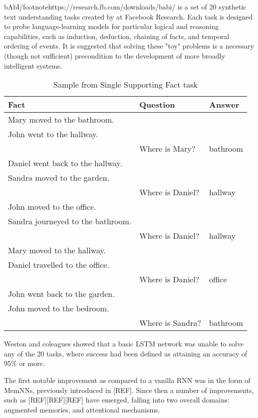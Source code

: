 \documentclass{article}
\begin{document}
bAbI/footnote{https://research.fb.com/downloads/babi/} is a set of 20 synthetic text understanding tasks created by \citet{2015arXiv150205698W} at Facebook Research. Each task is designed to probe language-learning models for particular logical and reasoning capabilities, such as induction, deduction, chaining of facts, and temporal ordering of events. It is suggested that solving these "toy" problems is a necessary (though not sufficient) precondition to the development of more broadly intelligent systems. 

\begin{table}[h]
\caption{Sample from Single Supporting Fact task}
\centering
\begin{tabular}{|l|l|l|}
\hline
Fact & Question & Answer \\
\hline
Mary moved to the bathroom. & & \\
John went to the hallway. & & \\
 & Where is Mary? & bathroom \\
Daniel went back to the hallway. & & \\
Sandra moved to the garden. & & \\
 & Where is Daniel? & hallway \\
John moved to the office. & & \\
Sandra journeyed to the bathroom. & & \\
& Where is Daniel? & hallway \\
Mary moved to the hallway. & & \\
Daniel travelled to the office. & & \\
& Where is Daniel? & office \\
John went back to the garden. & & \\
John moved to the bedroom. & & \\
& Where is Sandra? & bathroom \\
\hline
\end{tabular}
\end{table}

Weston and coleagues showed that a basic LSTM network was unable to solve any of the 20 tasks, where success had been defined as attaining an accuracy of 95\% or more.

The first notable improvement as compared to a vanilla RNN was in the form of MemNNs, previously introduced in [REF]. Since then a number of improvements, such as [REF][REF][REF] have emerged, falling into two overall domains: augmented memories, and attentional mechanisms.
\end{document}
